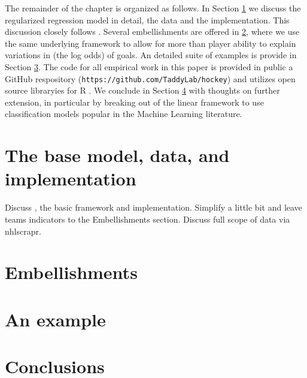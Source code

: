 The remainder of the chapter is organized as follows.  In Section
\ref{sec:base} we discuss the regularized regression model in detail, the data
and the implementation.  This discussion closely follows
\cite{gramacy:jensen:taddy:2013}.  Several embellishments are offered in
\ref{sec:embell}, where we use the same underlying framework to allow
for more than player ability to explain variations in (the log odds) of goals.
An detailed suite of examples is provide in Section \ref{sec:example}. The
code for all empirical work in this paper is provided in public a GitHub
respository (\verb!https://github.com/TaddyLab/hockey!) and utilizes open
source libraryies for {\sf R} \cite{cranR}.  We conclude in Section
\ref{sec:conclude} with thoughts on further extension, in particular by
breaking out of the linear framework to use classification models
popular in the Machine Learning literature.

\section{The base model, data, and implementation}
\label{sec:base}

Discuss \cite{gramacy:jensen:taddy:2013}, the basic framework and
implementation.  Simplify a little bit and leave teams indicators to the
Embellishments section.  Discuss full scope of data via nhlscrapr.


\section{Embellishments}
\label{sec:embell}

\section{An example}
\label{sec:example}

\section{Conclusions}
\label{sec:conclude}



